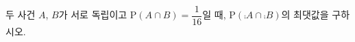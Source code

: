 두 사건 $A$, $B$가 서로 독립이고 $\mathrm{P}(A\cap B)=\dfrac{1}{16}$일 때, $\mathrm{P}(\comp{A}\cap\comp{B})$의 최댓값을 구하시오.
